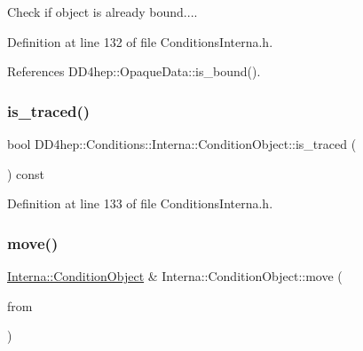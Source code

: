 Check if object is already bound.... 



Definition at line 132 of file Conditions\+Interna.\+h.



References D\+D4hep\+::\+Opaque\+Data\+::is\+\_\+bound().

\hypertarget{class_d_d4hep_1_1_conditions_1_1_interna_1_1_condition_object_af957932641f216e024fd748497ea97bc}{}\label{class_d_d4hep_1_1_conditions_1_1_interna_1_1_condition_object_af957932641f216e024fd748497ea97bc} 
\subsubsection{\texorpdfstring{is\+\_\+traced()}{is\_traced()}}
{\footnotesize\ttfamily bool D\+D4hep\+::\+Conditions\+::\+Interna\+::\+Condition\+Object\+::is\+\_\+traced (\begin{DoxyParamCaption}{ }\end{DoxyParamCaption}) const\hspace{0.3cm}{\ttfamily [inline]}}



Definition at line 133 of file Conditions\+Interna.\+h.

\hypertarget{class_d_d4hep_1_1_conditions_1_1_interna_1_1_condition_object_a2d944a3507299b38f69c5bd8b66494a5}{}\label{class_d_d4hep_1_1_conditions_1_1_interna_1_1_condition_object_a2d944a3507299b38f69c5bd8b66494a5} 
\subsubsection{\texorpdfstring{move()}{move()}}
{\footnotesize\ttfamily \hyperlink{class_d_d4hep_1_1_conditions_1_1_interna_1_1_condition_object}{Interna\+::\+Condition\+Object} \& Interna\+::\+Condition\+Object\+::move (\begin{DoxyParamCaption}\item[{\hyperlink{class_d_d4hep_1_1_conditions_1_1_interna_1_1_condition_object}{Condition\+Object} \&}]{from }\end{DoxyParamCaption})}



